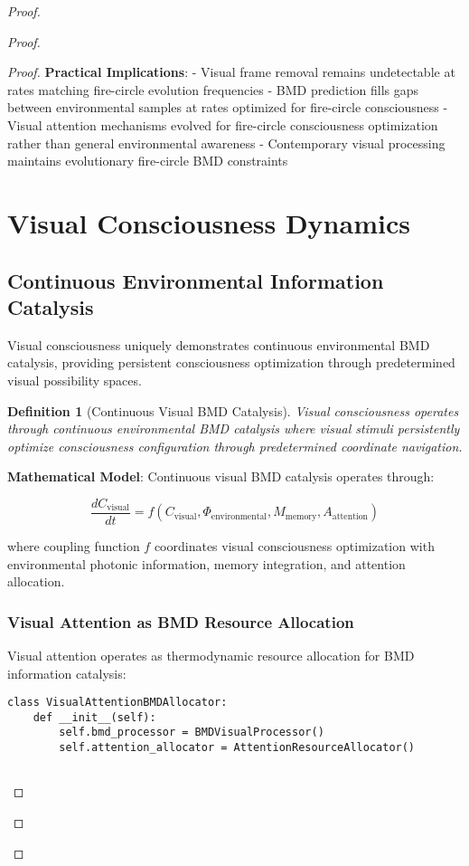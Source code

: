 \documentclass[12pt,a4paper]{article}
\newtheorem{definition}[theorem]{Definition}
\begin{document}
\begin{proof}
{\begin{proof}
\begin{proof}
\textbf{Practical Implications}:
- Visual frame removal remains undetectable at rates matching fire-circle evolution frequencies
- BMD prediction fills gaps between environmental samples at rates optimized for fire-circle consciousness
- Visual attention mechanisms evolved for fire-circle consciousness optimization rather than general environmental awareness
- Contemporary visual processing maintains evolutionary fire-circle BMD constraints

\section{Visual Consciousness Dynamics}

\subsection{Continuous Environmental Information Catalysis}

Visual consciousness uniquely demonstrates continuous environmental BMD catalysis, providing persistent consciousness optimization through predetermined visual possibility spaces.

\begin{definition}[Continuous Visual BMD Catalysis]
Visual consciousness operates through continuous environmental BMD catalysis where visual stimuli persistently optimize consciousness configuration through predetermined coordinate navigation.
\end{definition}

\textbf{Mathematical Model}:
Continuous visual BMD catalysis operates through:

$$\frac{dC_{\text{visual}}}{dt} = f(C_{\text{visual}}, \Phi_{\text{environmental}}, M_{\text{memory}}, A_{\text{attention}})$$

where coupling function $f$ coordinates visual consciousness optimization with environmental photonic information, memory integration, and attention allocation.

\subsubsection{Visual Attention as BMD Resource Allocation}

Visual attention operates as thermodynamic resource allocation for BMD information catalysis:

\begin{lstlisting}[style=pythonstyle, caption=Visual Attention BMD Resource Allocation]
class VisualAttentionBMDAllocator:
    def __init__(self):
        self.bmd_processor = BMDVisualProcessor()
        self.attention_allocator = AttentionResourceAllocator()
        

\end{lstlisting}
\end{proof}
\end{proof}}
\end{proof}
\end{document}
